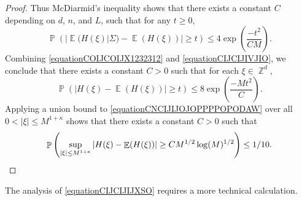 \documentclass[dvipsnames,letterpaper,12pt]{article}
\numberwithin{equation}{section}
\DeclareMathOperator{\ZZ}{\mathbb{Z}}
\numberwithin{theorem}{section}
\DeclareMathOperator{\EE}{\mathbb{E}}
\DeclareMathOperator{\PP}{\mathbb{P}}
\begin{document}
\begin{proof}
    Thus McDiarmid's inequality shows that there exists a constant $C$ depending on $d$, $n$, and $L$, such that for any $t \geq 0$,
    \begin{equation} \label{equationCIJCIJIVJIO}
        \PP \left( |\EE(H(\xi)|\Sigma) - \EE(H(\xi))| \geq t \right) \leq 4 \exp \left( \frac{-t^2}{C M} \right).
    \end{equation}
    Combining \eqref{equationCOIJCOIJX1232312} and \eqref{equationCIJCIJIVJIO}, we conclude that there exists a constant $C > 0$ such that for each $\xi \in \ZZ^d$,
    \begin{equation} \label{equationCNCIJIJOJOPPPPOPODAW}
        \PP \left( | H(\xi) - \EE(H(\xi)) | \geq t  \right) \leq 8 \exp \left( \frac{-M t^2}{C} \right).
    \end{equation}
    Applying a union bound to \eqref{equationCNCIJIJOJOPPPPOPODAW} over all $0 < |\xi| \leq M^{1 + \kappa}$ shows that there exists a constant $C > 0$ such that
    \[ \PP \left( \sup_{|\xi| \leq M^{1 + \kappa}} | H(\xi) - \EE(H(\xi)) | \geq C M^{1/2} \log(M)^{1/2} \right) \leq 1/10. \qedhere \]
\end{proof}

The analysis of \eqref{equationCIJCIJIJXSO} requires a more technical calculation.
\end{document}
